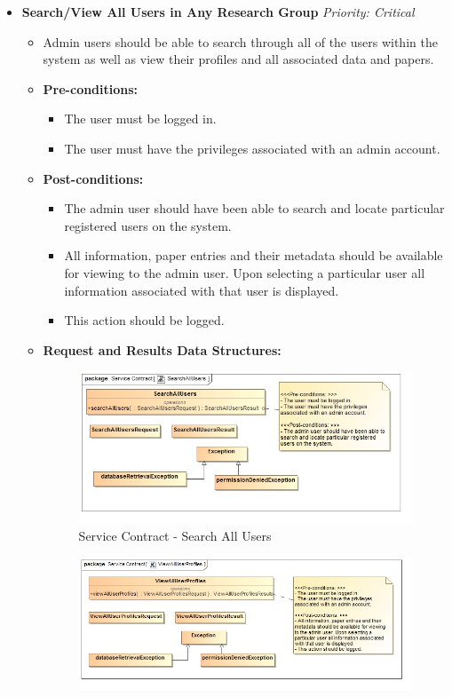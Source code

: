\documentclass{article}
\begin{document}
\begin{itemize}
					\cleardoublepage
					\item \textbf{Search/View All Users in Any Research Group} \hfill \textit{Priority: Critical}
					\begin{itemize}
						\item Admin users should be able to search through all of the users within the system as well as view their profiles and all associated data and papers.
						\item \textbf{Pre-conditions:}
						\begin{itemize}
							\item The user must be logged in.
							\item The user must have the privileges associated with an admin account.
						\end{itemize}
						\item \textbf{Post-conditions:}
						\begin{itemize}
							\item The admin user should have been able to search and locate particular registered users on the system.
							\item All information, paper entries and their metadata should be available for viewing to the admin user. Upon selecting a particular user all information associated with that user is displayed.
							\item This action should be logged.
						\end{itemize}
						\item \textbf{Request and Results Data Structures:}
						\begin{figure}[H]
							\includegraphics[width=\linewidth]{../Diagrams/ServiceContracts/User subsystem/SearchAllUsers.jpg}
							\caption{Service Contract - Search All Users}
						\end{figure}
						\begin{figure}[H]
							\includegraphics[width=\linewidth]{../Diagrams/ServiceContracts/User subsystem/ViewAllUserProfiles.jpg}

\end{figure}
\end{itemize}
\end{itemize}
\end{document}
